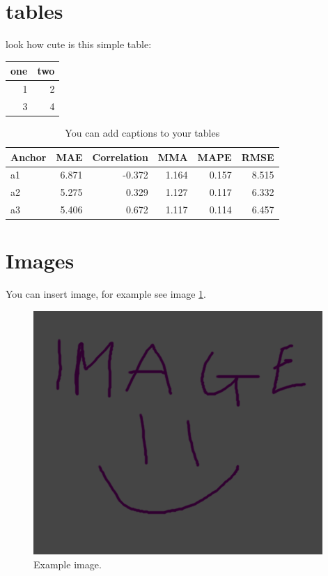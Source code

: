 \section{tables}
\label{sec:org522110f}

look how cute is this simple table:

\begin{center}
\begin{tabular}{rr}
one & two\\
\hline
1 & 2\\
3 & 4\\
\end{tabular}
\end{center}

\begin{table}[htbp]
\caption{\label{tab:orgc4eec67}
You can add captions to your tables}
\centering
\begin{tabular}{lrrrrr}
Anchor & MAE & Correlation & MMA & MAPE & RMSE\\
\hline
a1 & 6.871 & -0.372 & 1.164 & 0.157 & 8.515\\
a2 & 5.275 & 0.329 & 1.127 & 0.117 & 6.332\\
a3 & 5.406 & 0.672 & 1.117 & 0.114 & 6.457\\
\end{tabular}
\end{table}

\section{Images}
\label{sec:org7c0a822}
You can insert image, for example see image \ref{fig:orgb73ad32}.

\begin{figure}[htbp]
\centering
\includegraphics[width=.9\linewidth]{./img/example_image.png}
\caption{\label{fig:orgb73ad32}
Example image.}
\end{figure}

